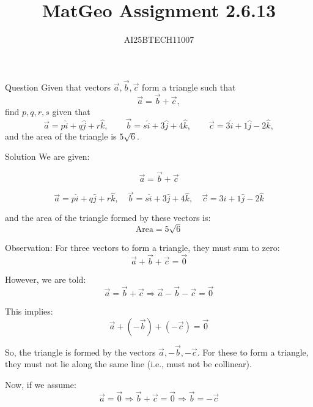 \documentclass{beamer}
\title 
{MatGeo Assignment 2.6.13}
\author
{AI25BTECH11007}
\begin{document}
\frame{\titlepage}
\begin{frame}{Question}
Given that vectors $\vec{a},\vec{b},\vec{c}$ form a triangle such that
\[
\vec{a}=\vec{b}+\vec{c},
\]
find $p,q,r,s$ given that
\[
\vec{a}=p\hat{i}+q\hat{j}+r\hat{k},\qquad
\vec{b}=s\hat{i}+3\hat{j}+4\hat{k},\qquad
\vec{c}=3\hat{i}+1\hat{j}-2\hat{k},
\]
and the area of the triangle is $5\sqrt{6}$.\\


\end{frame}
\begin{frame}{Solution}
We are given:

\begin{equation}
\vec{a} = \vec{b} + \vec{c}
\end{equation}

\begin{equation}
\vec{a} = p\hat{i} + q\hat{j} + r\hat{k}, \quad
\vec{b} = s\hat{i} + 3\hat{j} + 4\hat{k}, \quad
\vec{c} = 3\hat{i} + 1\hat{j} -2\hat{k}
\end{equation}

and the area of the triangle formed by these vectors is:
\begin{equation}
\text{Area} = 5\sqrt{6}
\end{equation}

\vspace{1em}
\end{frame}
\begin{frame}{Observation:}
For three vectors to form a triangle, they must sum to zero:
\begin{equation}
\vec{a} + \vec{b} + \vec{c} = \vec{0}
\end{equation}

However, we are told:
\begin{equation}
\vec{a} = \vec{b} + \vec{c} \Rightarrow \vec{a} - \vec{b} - \vec{c} = \vec{0}
\end{equation}

This implies:
\begin{equation}
\vec{a} + (-\vec{b}) + (-\vec{c}) = \vec{0}
\end{equation}

So, the triangle is formed by the vectors $\vec{a}, -\vec{b}, -\vec{c}$. For these to form a triangle, they must not lie along the same line (i.e., must not be collinear).

\vspace{1em}
Now, if we assume:
\begin{equation}
\vec{a} = \vec{0}
\Rightarrow \vec{b} + \vec{c} = \vec{0}
\Rightarrow \vec{b} = -\vec{c}
\end{equation}
\end{frame}
\end{document}
